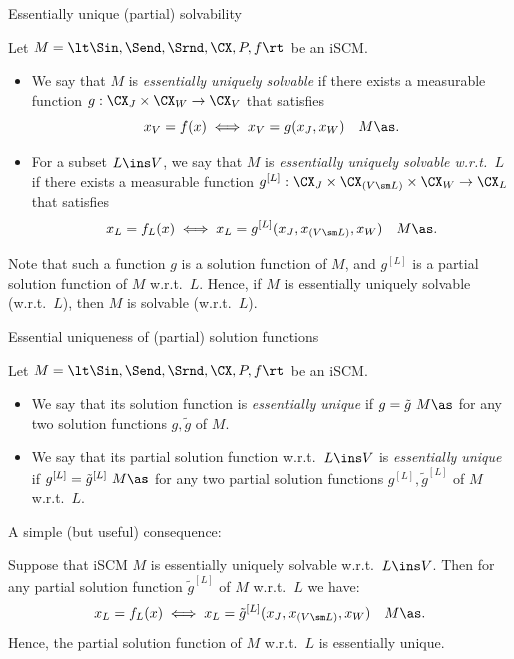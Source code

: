 \begin{frame}{Essentially unique (partial) solvability}
\begin{Def}[\ref{def:scm_unique_solvability}]
  Let $M = \lt \Sin, \Send, \Srnd, \CX, P, f \rt$ be an iSCM.
  \begin{itemize}
    \item
  We say that $M$ is \emph{essentially uniquely solvable} if there exists a measurable function $g : \CX_J \times \CX_W \to \CX_V$ that satisfies
    $$x_V = f(x) \iff x_V = g(x_J,x_W)\quad M\as.$$
  \item
  For a subset $L \ins V$, we say that $M$ is \emph{essentially uniquely solvable w.r.t.\ $L$} if there exists a measurable function $g^{[L]} : \CX_J \times \CX_{(V\sm L)} \times \CX_W \to \CX_L$ that satisfies
    $$x_L = f_L(x) \iff x_L = g^{[L]}(x_J,x_{(V\sm L)},x_W)\quad M\as.$$
  \end{itemize}
\end{Def}
Note that such a function $g$ is a solution function of $M$, and $g^{[L]}$ is a partial solution function of $M$ w.r.t.\ $L$.
Hence, if $M$ is essentially uniquely solvable (w.r.t.\ $L$), then $M$ is solvable (w.r.t.\ $L$).
\end{frame}

\begin{frame}{Essential uniqueness of (partial) solution functions}
\begin{Def}[\ref{def:scm_essentially_unique_solution_function}]
  Let $M = \lt \Sin, \Send, \Srnd, \CX, P, f \rt$ be an iSCM.
  \begin{itemize}
    \item
  We say that its solution function is \emph{essentially unique} if $g = \tilde{g}\ M\as$ for any two solution functions $g,\tilde{g}$ of $M$.
\item
  We say that its partial solution function w.r.t.\ $L \ins V$ is \emph{essentially unique} if $g^{[L]} = \tilde{g}^{[L]}\ M\as$ for any two partial solution functions $g^{[L]}, \tilde{g}^{[L]}$ of $M$ w.r.t.\ $L$.
  \end{itemize}
\end{Def}
A simple (but useful) consequence:
\begin{Prp}[\ref{prp:scm_essentially_unique_solution_functions}]
  Suppose that iSCM $M$ is essentially uniquely solvable w.r.t.\ $L \ins V$.
  Then for any partial solution function $\tilde{g}^{[L]}$ of $M$ w.r.t.\ $L$ we have:
    $$x_L = f_L(x) \iff x_L = \tilde{g}^{[L]}(x_J,x_{(V\sm L)},x_W)\quad M\as.$$
  Hence, the partial solution function of $M$ w.r.t.\ $L$ is essentially unique.
\end{Prp}
\end{frame}

